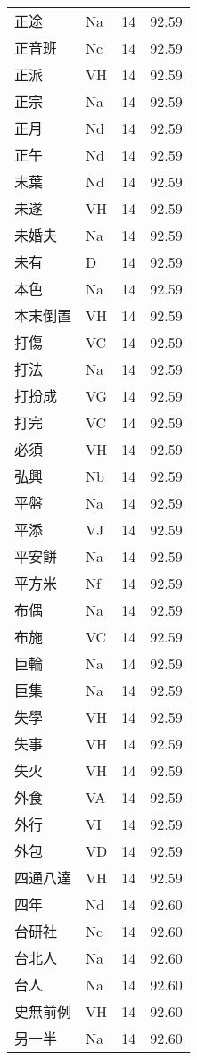 \documentclass[twocolumn]{book}
\begin{document}
\begin{supertabular}{llrr}
正途 & Na & 14 &  92.59\\
正音班 & Nc & 14 &  92.59\\
正派 & VH & 14 &  92.59\\
正宗 & Na & 14 &  92.59\\
正月 & Nd & 14 &  92.59\\
正午 & Nd & 14 &  92.59\\
末葉 & Nd & 14 &  92.59\\
未遂 & VH & 14 &  92.59\\
未婚夫 & Na & 14 &  92.59\\
未有 & D & 14 &  92.59\\
本色 & Na & 14 &  92.59\\
本末倒置 & VH & 14 &  92.59\\
打傷 & VC & 14 &  92.59\\
打法 & Na & 14 &  92.59\\
打扮成 & VG & 14 &  92.59\\
打完 & VC & 14 &  92.59\\
必須 & VH & 14 &  92.59\\
弘興 & Nb & 14 &  92.59\\
平盤 & Na & 14 &  92.59\\
平添 & VJ & 14 &  92.59\\
平安餅 & Na & 14 &  92.59\\
平方米 & Nf & 14 &  92.59\\
布偶 & Na & 14 &  92.59\\
布施 & VC & 14 &  92.59\\
巨輪 & Na & 14 &  92.59\\
巨集 & Na & 14 &  92.59\\
失學 & VH & 14 &  92.59\\
失事 & VH & 14 &  92.59\\
失火 & VH & 14 &  92.59\\
外食 & VA & 14 &  92.59\\
外行 & VI & 14 &  92.59\\
外包 & VD & 14 &  92.59\\
四通八達 & VH & 14 &  92.59\\
四年 & Nd & 14 &  92.60\\
台研社 & Nc & 14 &  92.60\\
台北人 & Na & 14 &  92.60\\
台人 & Na & 14 &  92.60\\
史無前例 & VH & 14 &  92.60\\
另一半 & Na & 14 &  92.60\\

\end{supertabular}
\end{document}
